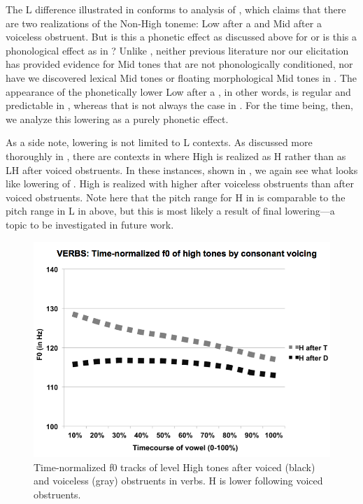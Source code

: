\documentclass[output=paper
,newtxmath
,modfonts
,nonflat]{langsci/langscibook}
\begin{document}
 

The L  difference illustrated in  conforms to  analysis of , which claims that there are two realizations of the Non-High toneme: Low after a  and Mid after a voiceless obstruent. But is this a phonetic effect as discussed above for  \citep{Oglesbee2008} or is this a phonological effect as in ? Unlike , neither previous  literature nor our elicitation has provided evidence for Mid tones that are not phonologically conditioned, nor have we discovered lexical Mid tones or floating morphological Mid tones in . The appearance of the phonetically lower Low after a , in other words, is regular and predictable in , whereas that is not always the case in . For the time being, then, we analyze this  lowering as a purely phonetic effect.

As a side note,   lowering is not limited to L  contexts. As discussed more thoroughly in , there are contexts in  where High  is realized as H rather than as LH after voiced obstruents. In these instances, shown in , we again see what looks like  lowering of . High  is realized with higher  after voiceless obstruents than after voiced obstruents. Note here that the pitch range for H  in  is comparable to the pitch range in L  in  above, but this is most likely a result of final lowering—a topic to be investigated in future work. 

  
\begin{figure}

\includegraphics[width=\textwidth]{figures/Lotven-img6.png}
\caption{\label{fig:lotven:5} Time-normalized f0 tracks of level High tones after voiced (black) and voiceless (gray) obstruents in verbs. H is lower following voiced obstruents.}
\end{figure}
\end{document}
